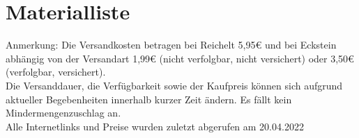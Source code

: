 \documentclass[12pt,a4paper,openany]{scrbook}
\begin{document}
	
	 
	\newpage
\chapter{Materialliste}
Anmerkung: Die Versandkosten betragen bei Reichelt 5,95€ und bei Eckstein abhängig von der Versandart 1,99€ (nicht verfolgbar, nicht versichert) oder 3,50€ (verfolgbar, versichert).\\ Die Versanddauer, die Verfügbarkeit sowie der Kaufpreis können sich aufgrund aktueller Begebenheiten innerhalb kurzer Zeit ändern. Es fällt kein Mindermengenzuschlag an.\\ 
Alle Internetlinks und Preise wurden zuletzt abgerufen am 20.04.2022

\vspace{1cm}
\centering
\end{document}

